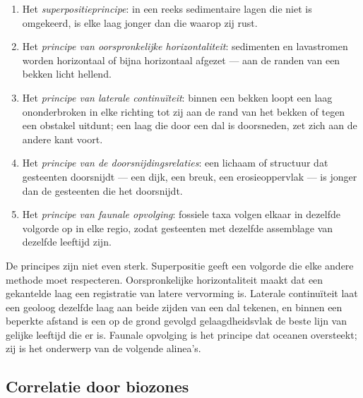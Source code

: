\begin{definition}\label{def:b1:stratigraphic-scale:principles}
\begin{enumerate}
  \item Het \emph{superpositieprincipe}: in een reeks sedimentaire lagen die niet is omgekeerd, is elke laag jonger dan die waarop zij rust.
  \item Het \emph{principe van oorspronkelijke horizontaliteit}: sedimenten en lavastromen worden horizontaal of bijna horizontaal afgezet --- aan de randen van een bekken licht hellend.
  \item Het \emph{principe van laterale continuïteit}: binnen een bekken loopt een laag ononderbroken in elke richting tot zij aan de rand van het bekken of tegen een obstakel uitdunt; een laag die door een dal is doorsneden, zet zich aan de andere kant voort.
  \item Het \emph{principe van de doorsnijdingsrelaties}: een lichaam of structuur dat gesteenten doorsnijdt --- een dijk, een breuk, een erosieoppervlak --- is jonger dan de gesteenten die het doorsnijdt.
  \item Het \emph{principe van faunale opvolging}: fossiele taxa volgen elkaar in dezelfde volgorde op in elke regio, zodat gesteenten met dezelfde assemblage van dezelfde leeftijd zijn.
\end{enumerate}
\end{definition}

De principes zijn niet even sterk. Superpositie geeft een volgorde die elke andere methode moet respecteren. Oorspronkelijke horizontaliteit maakt dat een gekantelde laag een registratie van latere vervorming is. Laterale continuïteit laat een geoloog dezelfde laag aan beide zijden van een dal tekenen, en binnen een beperkte afstand is een op de grond gevolgd gelaagdheidsvlak de beste lijn van gelijke leeftijd die er is. Faunale opvolging is het principe dat oceanen oversteekt; zij is het onderwerp van de volgende alinea's.

\subsection*{Correlatie door biozones}

